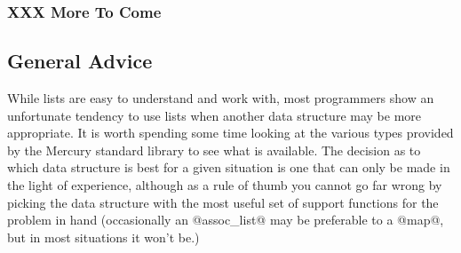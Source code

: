 \subsubsection{XXX More To Come}

\subsection{General Advice}


While lists are easy to understand and work with, most programmers show
an unfortunate tendency to use lists when another data structure may be
more appropriate.  It is worth spending some time looking at the various
types provided by the Mercury standard library to see what is available.
The decision as to which data structure is best for a given situation is
one that can only be made in the light of experience, although as a rule
of thumb you cannot go far wrong by picking the data structure with the
most useful set of support functions for the problem in hand
(occasionally an @assoc_list@ may be preferable to a @map@, but in most
situations it won't be.)

